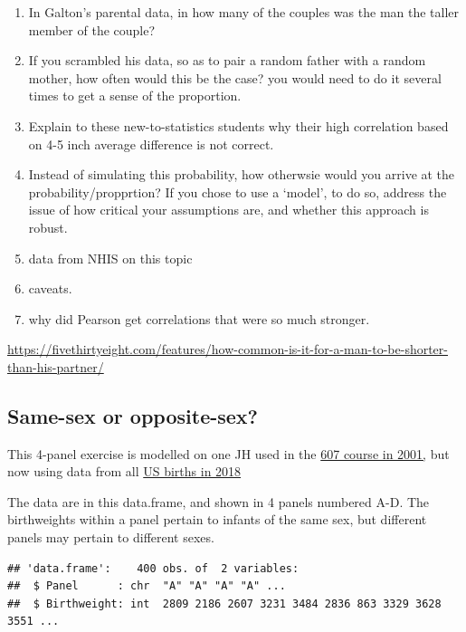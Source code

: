 \documentclass[]{book}
\begin{document}
\begin{enumerate}
\def\labelenumi{\arabic{enumi}.}
\item
  In Galton's parental data, in how many of the couples was the man the taller member of the couple?
\item
  If you scrambled his data, so as to pair a random father with a random mother, how often would this be the case? you would need to do it several times to get a sense of the proportion.
\item
  Explain to these new-to-statistics students why their high correlation based on 4-5 inch average difference is not correct.
\item
  Instead of simulating this probability, how otherwsie would you arrive at the probability/propprtion? If you chose to use a `model',
  to do so, address the issue of how critical your assumptions are, and whether this approach is robust.
\item
  data from NHIS on this topic
\item
  caveats.
\item
  why did Pearson get correlations that were so much stronger.
\end{enumerate}

\url{https://fivethirtyeight.com/features/how-common-is-it-for-a-man-to-be-shorter-than-his-partner/}

\hypertarget{same-sex-or-opposite-sex}{%
\subsection{Same-sex or opposite-sex?}\label{same-sex-or-opposite-sex}}

This 4-panel exercise is modelled on one JH used in the \href{http://www.medicine.mcgill.ca/epidemiology/hanley/c607/ch06/homegrown_exercises_06.pdf\#page=3}{607 course in 2001,} but now using data from all \href{https://www.cdc.gov/nchs/data_access/vitalstatsonline.htm}{US births in 2018}

The data are in this data.frame, and shown in 4 panels numbered A-D. The birthweights within a panel pertain to infants of the same sex, but different panels may pertain to different sexes.

\begin{verbatim}
## 'data.frame':    400 obs. of  2 variables:
##  $ Panel      : chr  "A" "A" "A" "A" ...
##  $ Birthweight: int  2809 2186 2607 3231 3484 2836 863 3329 3628 3551 ...
\end{verbatim}
\end{document}

